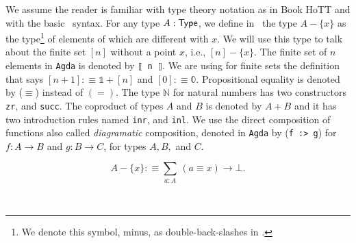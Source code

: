 \documentclass[11pt, a4paper, oneside]{amsart}
\begin{document}
We assume the reader is familiar with type theory notation as in Book HoTT
\cite{hottbook} and with the basic \Agda\, syntax. For any type $A : \mathsf{Type}$,
we define in~ the type $A - \{x\}$ as the type\footnote{We
denote this symbol, minus, as  double-back-slashes in \Agda.} of elements of
which are different with $x$. We will use this type to talk about the finite
set $[n]$ without a point $x$, i.e., $[n] - \{ x\}$. The finite set of $n$
elements in \texttt{Agda} is denoted by \texttt{⟦ n ⟧}. We are using for
finite sets the definition that says $[n + 1] :\equiv 𝟙 + [n]$ and $[0]
:\equiv 𝟘$. Propositional equality is denoted by ($\equiv$) instead of $(=)$.
The type $ℕ$ for natural numbers has two constructors \texttt{zr}, and
\texttt{succ}. The coproduct of types $A$ and $B$ is denoted by $A+B$ and it
has two introduction rules named \texttt{inr}, and \texttt{inl}. We use the
direct composition of functions also called \emph{diagramatic} composition,
denoted in \texttt{Agda} by (\texttt{f :> g}) for $f : A \to B$ and $g : B \to
C$, for types $A,B,$ and $C$.

\begin{equation}\label{eq:minus}
A - \{x\} :\equiv \sum_{a : A} \, (a ≡ x) → \bot.
\end{equation}

\begin{code}[hide]%
%
\>[2]\AgdaOperator{\AgdaFunction{\AgdaUnderscore{}\textbackslash{}\textbackslash{}\AgdaUnderscore{}}}%
\>[8]\AgdaSymbol{:}\AgdaSpace{}%
\AgdaSpace{}%
\AgdaSymbol{\{}\AgdaSpace{}%
\AgdaSymbol{:}\AgdaSpace{}%
\AgdaSymbol{\}}\AgdaSpace{}%
\AgdaSpace{}%
\AgdaSymbol{(}\AgdaSpace{}%
\AgdaSymbol{:}\AgdaSpace{}%
\AgdaSpace{}%
\AgdaSymbol{)}\AgdaSpace{}%
\AgdaSymbol{(}\AgdaSpace{}%
\AgdaSymbol{:}\AgdaSpace{}%
\AgdaSymbol{)}\AgdaSpace{}%
\AgdaSpace{}%
\AgdaSpace{}%
\<%
\\
%
\>[2]\AgdaOperator{\AgdaFunction{\AgdaUnderscore{}\textbackslash{}\textbackslash{}\AgdaUnderscore{}}}%
\>[8]\AgdaSymbol{\{}\AgdaSymbol{\}}\AgdaSpace{}%
\AgdaSpace{}%
%
\>[17]\AgdaSymbol{=}\AgdaSpace{}%
\AgdaSpace{}%
\AgdaSpace{}%
\AgdaSpace{}%
\AgdaSpace{}%
\AgdaSpace{}%
\AgdaSymbol{((}\AgdaSpace{}%
\AgdaSpace{}%
\AgdaSymbol{)}\AgdaSpace{}%
\AgdaSpace{}%
\AgdaSpace{}%
\AgdaSymbol{))}\<%
\end{code}
\end{document}
